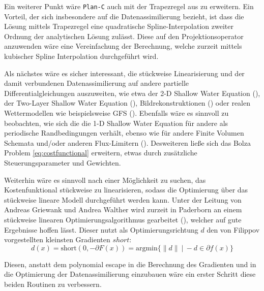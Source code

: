 Ein weiterer Punkt wäre \texttt{Plan-C} auch mit der Trapezregel aus \cite[S.23 (15)]{monster} zu erweitern. Ein Vorteil, der sich insbesondere auf die Datenassimilierung bezieht, ist dass die Lösung mittels Trapezregel eine quadratische Spline-Interpolation zweiter Ordnung der analytischen Lösung zulässt. Diese auf den Projektionsoperator anzuwenden wäre eine Vereinfachung der Berechnung, welche zurzeit mittels kubischer Spline Interpolation durchgeführt wird.

Als nächstes wäre es sicher interessant, die stückweise Linearisierung und der damit verbundenen Datenassimilierung auf andere partielle Differentialgleichungen auszuweiten, wie etwa der 2-D Shallow Water Equation (\cite[\S 3]{kurganov2007second}), der Two-Layer Shallow Water Equation (\cite{kurganov2009central}), Bildrekonstruktionen (\cite{korotaev2008retrieving}) oder realen Wettermodellen wie beispielsweise GFS (\cite{gfs}). 
Ebenfalls wäre es sinnvoll zu beobachten, wie sich die die 1-D Shallow Water Equation für andere als periodische Randbedingungen verhält, ebenso wie für andere Finite Volumen Schemata und/oder anderen Flux-Limitern (\cite{juntasaro2004comparative}).
Desweiteren ließe sich das Bolza Problem \eqref{eq:costfunctional} erweitern, etwas durch zusätzliche Steuerungsparameter und Gewichten. 

Weiterhin wäre es sinnvoll nach einer Möglichkeit zu suchen, das Kostenfunktional stückweise zu linearisieren, sodass die Optimierung über das stückweise lineare Modell durchgeführt werden kann.
Unter der Leitung von Andreas Griewank und Andrea Walther wird zurzeit in Paderborn an einem stückweise linearen Optimierungsalgorithmus gearbeitet (\cite{griewank2014lipschitz}), welcher auf gute Ergebnisse hoffen lässt. 
Dieser nutzt als Optimierungsrichtung $d$ den von Filippov vorgestellten kleinsten Gradienten $short$:
\[
d(x) = \text{short}(0,-\partial F(x)) = \text{argmin} \lbrace \|d\| ~|~ -d \in \partial f(x) \rbrace
\]

Diesen, anstatt dem polynomial escape in die Berechnung des Gradienten und in die Optimierung der Datenassimilierung einzubauen wäre ein erster Schritt diese beiden Routinen zu verbessern.
